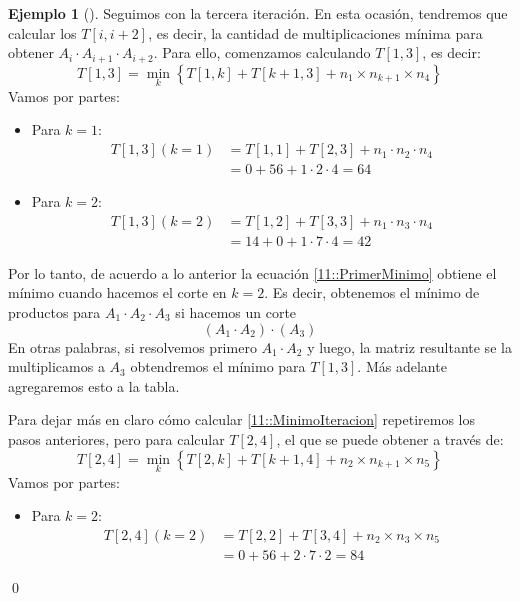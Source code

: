 \documentclass[english, spanish, fleqn, 10pt]{article}
\numberwithin{equation}{section}
\newcommand{\nparentesis}[1]{\left( #1 \right)}
\newcommand{\llaves}[1]{\left \{ #1 \right \}}
\newcommand{\ncorchetes}[1]{\left[ #1 \right]}
\theoremstyle{definition}
\newtheorem{beforeExample}{Ejemplo}[section]
\newenvironment{ejemplo}[1][]{\begin{beforeExample}[#1]\renewcommand{\qedsymbol}{$\blacksquare$}}{\qed\end{beforeExample}}
\begin{document}
\begin{ejemplo}
	Seguimos con la tercera iteración. En esta ocasión, tendremos que calcular los $T\ncorchetes{i, i+2}$, es decir, la cantidad de multiplicaciones mínima para obtener $A_i\cdot A_{i+1}\cdot A_{i+2}$. Para ello, comenzamos calculando $T\ncorchetes{1, 3}$, es decir:
	\begin{equation}\label{11::PrimerMinimo}
	T\ncorchetes{1, 3}=\min_k\llaves{T\ncorchetes{1, k}+T\ncorchetes{k+1, 3}+n_1\times n_{k+1}\times n_4}
	\end{equation}
	Vamos por partes:
	\begin{itemize}
		\item Para $k=1$:
		\begin{align*}
		T\ncorchetes{1, 3}\nparentesis{k=1}&=T\ncorchetes{1, 1}+T\ncorchetes{2, 3}+n_1\cdot n_2\cdot n_4\\
		&=0+56+1\cdot 2\cdot 4=64
		\end{align*}
		\item Para $k=2$:
		\begin{align*}
		T\ncorchetes{1, 3}\nparentesis{k=2}&=T\ncorchetes{1, 2}+T\ncorchetes{3, 3}+n_1\cdot n_{3}\cdot n_4\\
		&=14+0+1\cdot 7\cdot 4=42
		\end{align*}
	\end{itemize}
	Por lo tanto, de acuerdo a lo anterior la ecuación \eqref{11::PrimerMinimo} obtiene el mínimo cuando hacemos el corte en $k=2$. Es decir, obtenemos el mínimo de productos para $A_1\cdot A_2\cdot A_3$ si hacemos un corte
	\begin{equation}
	\nparentesis{A_1\cdot A_2}\cdot \nparentesis{A_3}
	\end{equation}
	En otras palabras, si resolvemos primero $A_1\cdot A_2$ y luego, la matriz resultante se la multiplicamos a $A_3$ obtendremos el mínimo para $T\ncorchetes{1, 3}$.	 Más adelante agregaremos esto a la tabla.
	
	Para dejar más en claro cómo calcular \eqref{11::MinimoIteracion} repetiremos los pasos anteriores, pero para calcular $T\ncorchetes{2, 4}$, el que se puede obtener a través de:
	\begin{equation}\label{11::SegundoMinimo}
	T\ncorchetes{2, 4}=\min_k\llaves{T\ncorchetes{2, k}+T\ncorchetes{k+1, 4}+n_2\times n_{k+1}\times n_5}
	\end{equation}
	Vamos por partes:
	\begin{itemize}
		\item Para $k=2$:
		\begin{align*}
		T\ncorchetes{2, 4}\nparentesis{k=2}&=T\ncorchetes{2, 2}+T\ncorchetes{3, 4}+n_2\times n_3\times n_5\\
		&=0+56+2\cdot 7\cdot 2=84
		\end{align*}
		

\end{itemize}
\end{ejemplo}
\end{document}
